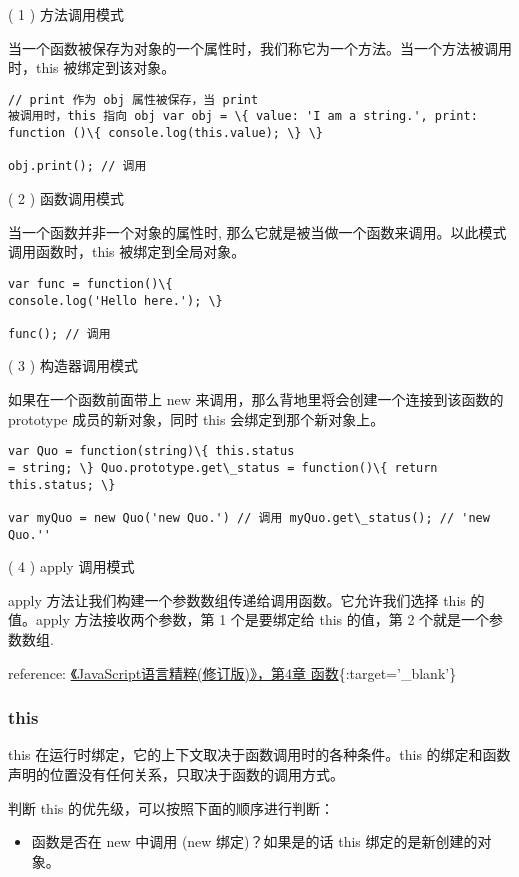 ( 1 ) 方法调用模式

当一个函数被保存为对象的一个属性时，我们称它为一个方法。当一个方法被调用时，this
被绑定到该对象。

\begin{verbatim}// print 作为 obj 属性被保存，当 print
被调用时，this 指向 obj var obj = \{ value: 'I am a string.', print:
function ()\{ console.log(this.value); \} \}

obj.print(); // 调用 
\end{verbatim}

( 2 ) 函数调用模式

当一个函数并非一个对象的属性时,
那么它就是被当做一个函数来调用。以此模式调用函数时，this
被绑定到全局对象。

\begin{verbatim}var func = function()\{
console.log('Hello here.'); \}

func(); // 调用 
\end{verbatim}

( 3 ) 构造器调用模式

如果在一个函数前面带上 new 来调用，那么背地里将会创建一个连接到该函数的
prototype 成员的新对象，同时 this 会绑定到那个新对象上。

\begin{verbatim}var Quo = function(string)\{ this.status
= string; \} Quo.prototype.get\_status = function()\{ return
this.status; \}

var myQuo = new Quo('new Quo.') // 调用 myQuo.get\_status(); // 'new
Quo.'' 
\end{verbatim}

( 4 ) apply 调用模式

apply 方法让我们构建一个参数数组传递给调用函数。它允许我们选择 this
的值。apply 方法接收两个参数，第 1 个是要绑定给 this 的值，第 2
个就是一个参数数组.

reference:
\href{http://book.douban.com/subject/3590768/}{《JavaScript语言精粹(修订版)》，第4章
函数}\{:target='\_blank'\}

\subsubsection{this}\label{this}

this 在运行时绑定，它的上下文取决于函数调用时的各种条件。this
的绑定和函数声明的位置没有任何关系，只取决于函数的调用方式。

判断 this 的优先级，可以按照下面的顺序进行判断：

\begin{itemize}
\tightlist
\item
  函数是否在 new 中调用 (new 绑定)？如果是的话 this
  绑定的是新创建的对象。
\end{itemize}

